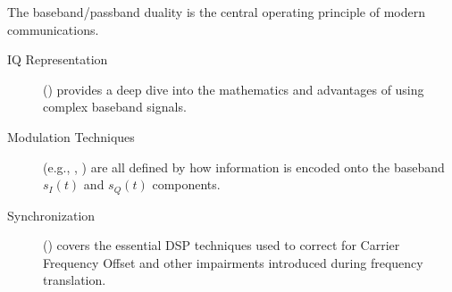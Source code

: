 \begin{importantbox}[title={Further Reading}]
    The baseband/passband duality is the central operating principle of modern communications.
    \begin{description}
        \item[IQ Representation] () provides a deep dive into the mathematics and advantages of using complex baseband signals.
        \item[Modulation Techniques] (e.g., , ) are all defined by how information is encoded onto the baseband $s_I(t)$ and $s_Q(t)$ components.
        \item[Synchronization] () covers the essential DSP techniques used to correct for Carrier Frequency Offset and other impairments introduced during frequency translation.
    \end{description}
\end{importantbox}